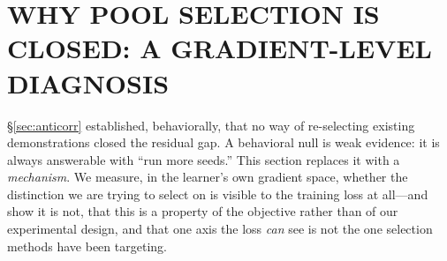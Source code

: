 %

\section{WHY POOL SELECTION IS CLOSED: A GRADIENT-LEVEL DIAGNOSIS}
\label{sec:gradient}

\S\ref{sec:anticorr} established, behaviorally, that no way of re-selecting
existing demonstrations closed the residual gap. A behavioral null is weak
evidence: it is always answerable with ``run more seeds.'' This section replaces
it with a \emph{mechanism}. We measure, in the learner's own gradient space,
whether the distinction we are trying to select on is visible to the training
loss at all---and show it is not, that this is a property of the objective
rather than of our experimental design, and that one axis the loss \emph{can}
see is not the one selection methods have been targeting.

